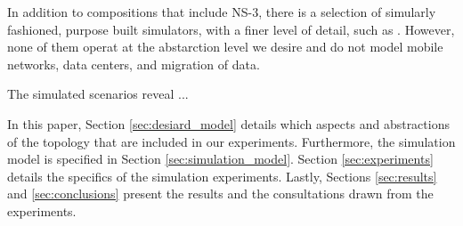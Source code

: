 In addition to compositions that include NS-3, there is a selection of simularly fashioned, purpose built simulators, with a finer level of detail, such as \cite{meisner2012bighouse,calheiros2011cloudsim}. However, none of them operat at the abstarction level we desire and do not model mobile networks, data centers, and migration of data.

The simulated scenarios reveal ...

In this paper, Section \ref{sec:desiard_model} details which aspects and abstractions of the \xcloud{} topology that are included in our experiments. Furthermore, the simulation model is specified in Section \ref{sec:simulation_model}. Section \ref{sec:experiments} details the specifics of the simulation experiments. Lastly, Sections \ref{sec:results} and \ref{sec:conclusions} present the results and the consultations drawn from the experiments.


